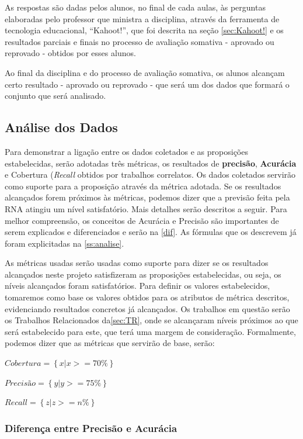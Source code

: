 \documentclass[
	12pt,				%
	openright,			%
	oneside,
	a4paper,			%
	english,			%
	french,				%
	spanish,			%
	brazil,				%
	]{abntex2}
\begin{document}
As respostas são dadas pelos alunos, no final de cada aulas, às perguntas elaboradas pelo professor que ministra a disciplina, através da ferramenta de tecnologia educacional, ``Kahoot!'', que foi descrita na seção \ref{sec:Kahoot!} e os resultados parciais e finais no processo de avaliação somativa - aprovado ou reprovado - obtidos por esses alunos.

Ao final da disciplina e do processo de avaliação somativa, os alunos alcançam certo resultado - aprovado ou reprovado - que será um dos dados que formará o conjunto que será analisado.

\subsection{Análise dos Dados}
Para demonstrar a ligação entre os dados coletados e as proposições estabelecidas, serão adotadas três métricas, os resultados de \textbf{precisão}, \textbf{Acurácia} e Cobertura (\textit{Recall} obtidos por trabalhos correlatos. Os dados coletados servirão como suporte para a proposição através da métrica adotada. Se os resultados alcançados forem próximos às métricas, podemos dizer que a previsão feita pela RNA atingiu um nível satisfatório. Mais detalhes serão descritos a seguir. Para melhor compreensão, os conceitos de Acurácia e Precisão são importantes de serem explicados e diferenciados e serão na \autoref{dif}. As fórmulas que os descrevem já foram explicitadas na \autoref{ss:analise}.

As métricas usadas serão usadas como suporte para dizer se os resultados alcançados neste projeto satisfizeram as proposições estabelecidas, ou seja, os níveis alcançados foram satisfatórios. Para definir os valores estabelecidos, tomaremos como base os valores obtidos para os atributos de métrica descritos, evidenciando resultados concretos já alcançados. Os trabalhos em questão serão os Trabalhos Relacionados da\autoref{sec:TR}, onde se alcançaram níveis próximos ao que será estabelecido para este, que terá uma margem de consideração. Formalmente, podemos dizer que as métricas que servirão de base, serão:

$Cobertura = \left \{ x | x >= 70\% \right \}$

$Precisão = \left \{ y | y >= 75\% \right \}$

$Recall = \left \{ z | z >= n\% \right \}$
\subsubsection{Diferença entre Precisão e Acurácia} \label{dif}
\end{document}
